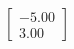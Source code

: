 \documentclass[preview]{standalone}
\begin{document}
\begin{align*}
\begin{bmatrix} -5.00 \\ 3.00 \end{bmatrix}
\end{align*}
\end{document}
